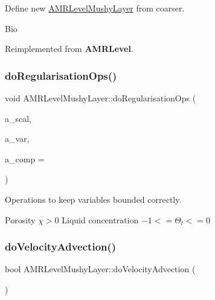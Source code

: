 Define new \hyperlink{class_a_m_r_level_mushy_layer}{A\+M\+R\+Level\+Mushy\+Layer} from coarser. 

Bio 

Reimplemented from \textbf{ A\+M\+R\+Level}.

\mbox{\label{class_a_m_r_level_mushy_layer_a906ecc9974f8cfee4d6709e12c150a3e}} 
\subsubsection{\texorpdfstring{do\+Regularisation\+Ops()}{doRegularisationOps()}}
{\footnotesize\ttfamily void A\+M\+R\+Level\+Mushy\+Layer\+::do\+Regularisation\+Ops (\begin{DoxyParamCaption}\item[{\textbf{ Level\+Data}$<$ \textbf{ F\+Array\+Box} $>$ \&}]{a\+\_\+scal,  }\item[{int}]{a\+\_\+var,  }\item[{int}]{a\+\_\+comp = {} }\end{DoxyParamCaption})\hspace{0.3cm}{\ttfamily [protected]}}



Operations to keep variables bounded correctly. 

Porosity $ \chi > 0 $ Liquid concentration $ -1 <= \Theta_l <= 0 $ \mbox{\label{class_a_m_r_level_mushy_layer_a75b13a9a6c8b2f6db2e1268e760ca9f9}} 
\subsubsection{\texorpdfstring{do\+Velocity\+Advection()}{doVelocityAdvection()}}
{\footnotesize\ttfamily bool A\+M\+R\+Level\+Mushy\+Layer\+::do\+Velocity\+Advection (\begin{DoxyParamCaption}{ }\end{DoxyParamCaption})\hspace{0.3cm}{\ttfamily [protected]}}



